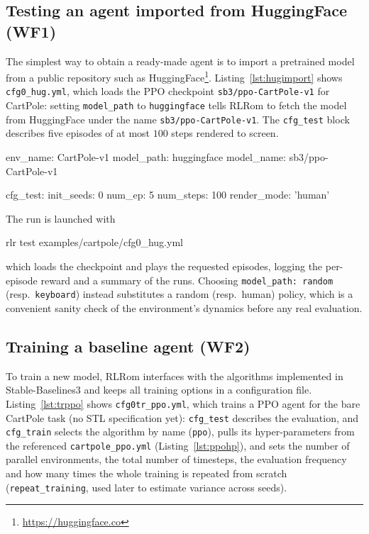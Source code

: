 \subsection{Testing an agent imported from HuggingFace (WF1)}

The simplest way to obtain a ready-made agent is to import a pretrained model from
a public repository such as HuggingFace\footnote{\url{https://huggingface.co}}.
Listing~\ref{lst:hugimport} shows \texttt{cfg0\_hug.yml}, which loads the PPO
checkpoint \texttt{sb3/ppo-CartPole-v1} for CartPole: setting
\texttt{model\_path} to \texttt{huggingface} tells RLRom to fetch the model from
HuggingFace under the name \texttt{sb3/ppo-CartPole-v1}. The \texttt{cfg\_test}
block describes five episodes of at most $100$ steps rendered to screen.

\begin{cfglisting}[caption={Testing a HuggingFace agent
(\texttt{examples/cartpole/cfg0\_hug.yml}).},label={lst:hugimport}]
env_name: CartPole-v1
model_path: huggingface
model_name: sb3/ppo-CartPole-v1

cfg_test:
  init_seeds: 0
  num_ep: 5
  num_steps: 100
  render_mode: 'human'
\end{cfglisting}

\noindent
The run is launched with
\begin{center}\ttfamily rlr test examples/cartpole/cfg0\_hug.yml\end{center}
which loads the checkpoint and plays the requested episodes, logging the per-
episode reward and a summary of the runs. Choosing \texttt{model\_path: random}
(resp.\ \texttt{keyboard}) instead substitutes a random (resp.\ human) policy,
which is a convenient sanity check of the environment's dynamics before any real
evaluation.

\subsection{Training a baseline agent (WF2)}

To train a new model, RLRom interfaces with the algorithms implemented in
Stable-Baselines3 and keeps all training options in a configuration file.
Listing~\ref{lst:trppo} shows \texttt{cfg0tr\_ppo.yml}, which trains a PPO agent
for the bare CartPole task (no STL specification yet): \texttt{cfg\_test}
describes the evaluation, and \texttt{cfg\_train} selects the algorithm by name
(\texttt{ppo}), pulls its hyper-parameters from the referenced
\texttt{cartpole\_ppo.yml} (Listing~\ref{lst:ppohp}), and sets the number of
parallel environments, the total number of timesteps, the evaluation frequency and
how many times the whole training is repeated from scratch
(\texttt{repeat\_training}, used later to estimate variance across seeds).

